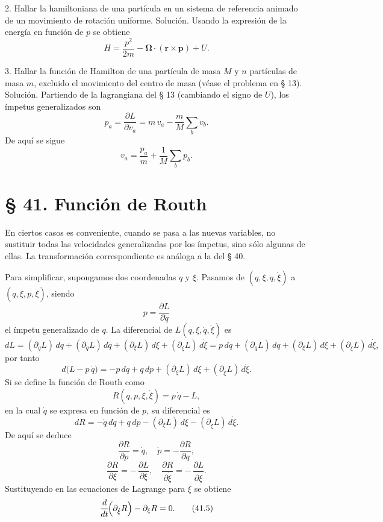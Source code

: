 \documentclass[12pt]{article}
\begin{document}
2. Hallar la hamiltoniana de una partícula en un sistema de referencia animado de un movimiento de rotación uniforme.  
Solución.  
Usando la expresión de la energía en función de \(p\) se obtiene
\[
H=\frac{p^2}{2m}-\boldsymbol\Omega\!\cdot(\mathbf r\times\mathbf p)+U.
\]

3. Hallar la función de Hamilton de una partícula de masa \(M\) y \(n\) partículas de masa \(m\), excluido el movimiento del centro de masa (véase el problema en § 13).  
Solución.  
Partiendo de la lagrangiana del § 13 (cambiando el signo de \(U\)), los ímpetus generalizados son
\[
p_a=\frac{\partial L}{\partial \dot v_a}
= m\,v_a-\frac{m}{M}\sum_{b}v_b.
\]
De aquí se sigue
\[
v_a=\frac{p_a}{m}+\frac{1}{M}\sum_{b}p_b.
\]

\section*{§ 41. Función de Routh}

En ciertos casos es conveniente, cuando se pasa a las nuevas variables, no sustituir todas las velocidades generalizadas por los ímpetus, sino sólo algunas de ellas. La transformación correspondiente es análoga a la del § 40.

Para simplificar, supongamos dos coordenadas \(q\) y \(\xi\). Pasamos de \((q,\xi,\dot q,\dot\xi)\) a \((q,\xi,p,\dot\xi)\), siendo 
\[
p=\frac{\partial L}{\partial \dot q}
\]
el ímpetu generalizado de \(q\). La diferencial de \(L(q,\xi,\dot q,\dot\xi)\) es
\[
dL
=(\partial_qL)\,dq+(\partial_{\dot q}L)\,d\dot q
+(\partial_\xi L)\,d\xi+(\partial_{\dot\xi}L)\,d\dot\xi
=p\,d\dot q+(\partial_qL)\,dq+(\partial_\xi L)\,d\xi+(\partial_{\dot\xi}L)\,d\dot\xi,
\]
por tanto
\[
d\bigl(L-p\,\dot q\bigr)
=-p\,dq+q\,dp+(\partial_\xi L)\,d\xi+(\partial_{\dot\xi}L)\,d\dot\xi.
\]
Si se define la función de Routh como
\begin{equation}
R(q,p,\xi,\dot\xi)=p\,\dot q-L,
\tag{41.1}
\end{equation}
en la cual \(\dot q\) se expresa en función de \(p\), su diferencial es
\begin{equation}
dR=-\dot q\,dq+q\,dp-(\partial_\xi L)\,d\xi-(\partial_{\dot\xi}L)\,d\dot\xi.
\tag{41.2}
\end{equation}
De aquí se deduce
\begin{equation}
\frac{\partial R}{\partial p}=\dot q,\quad
\dot p=-\frac{\partial R}{\partial q},
\tag{41.3}
\end{equation}
\begin{equation}
\frac{\partial R}{\partial \xi}=-\,\frac{\partial L}{\partial \xi},\quad
\frac{\partial R}{\partial \dot\xi}=-\,\frac{\partial L}{\partial \dot\xi}.
\tag{41.4}
\end{equation}
Sustituyendo en las ecuaciones de Lagrange para \(\xi\) se obtiene
\begin{equation}
\frac{d}{dt}\!\Bigl(\partial_{\dot\xi}R\Bigr)
-\partial_\xi R=0.
\tag{41.5}
\end{equation}
\end{document}
